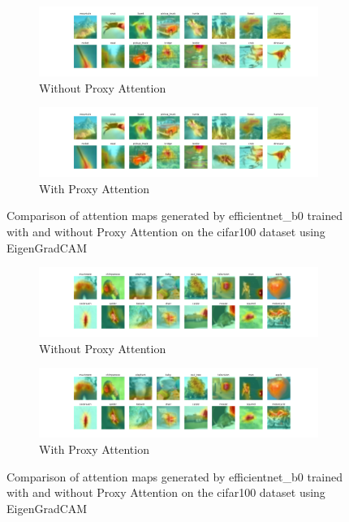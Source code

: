 \documentclass[a4paper,11pt,openright]{book}
\begin{document}
\begin{figure}[!htb]
    \centering
    \begin{subfigure}[b]{1\textwidth}
        \includegraphics[width=\textwidth]{images/cifar100_efficientnet_b0_noproxy_2.pdf}
        \caption{Without Proxy Attention}
    \end{subfigure}
    \hfill
    \begin{subfigure}[b]{1\textwidth}
        \includegraphics[width=\textwidth]{images/cifar100_efficientnet_b0_proxy_2.pdf}
        \caption{With Proxy Attention}
    \end{subfigure}
    \caption{Comparison of attention maps generated by efficientnet\_b0 trained with and without Proxy Attention on the cifar100 dataset using EigenGradCAM}
\end{figure}


\begin{figure}[!htb]
    \centering
    \begin{subfigure}[b]{1\textwidth}
        \includegraphics[width=\textwidth]{images/cifar100_efficientnet_b0_noproxy_3.pdf}
        \caption{Without Proxy Attention}
    \end{subfigure}
    \hfill
    \begin{subfigure}[b]{1\textwidth}
        \includegraphics[width=\textwidth]{images/cifar100_efficientnet_b0_proxy_3.pdf}
        \caption{With Proxy Attention}
    \end{subfigure}
    \caption{Comparison of attention maps generated by efficientnet\_b0 trained with and without Proxy Attention on the cifar100 dataset using EigenGradCAM}
\end{figure}
\end{document}
